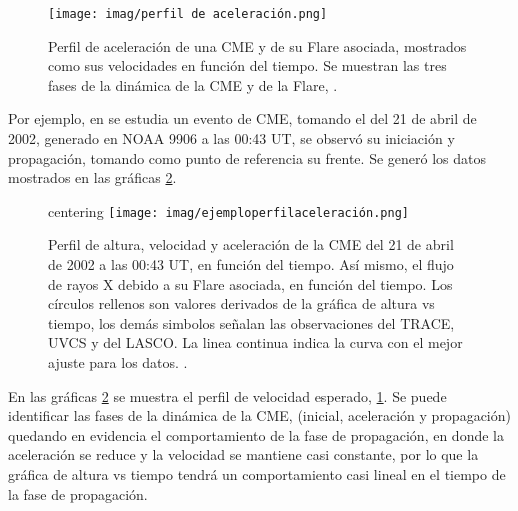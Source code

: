 \begin{figure}[H]
\centering
    \texttt{[image: imag/perfil de aceleración.png]}
    \caption[Gráfica de velocidad de propagación de la CME en función del tiempo, con sus diferentes etapas]{Perfil de aceleración de una \ac{CME} y de su Flare asociada, mostrados como sus velocidades en función del tiempo. Se muestran las tres fases de la dinámica de la \ac{CME} y de la Flare, \cite{zhang-2006}.}
    \label{fig:perfilaceleración}
\end{figure}

Por ejemplo, en \cite{gallagher-2003} se estudia un evento de CME, tomando el del 21 de abril de 2002, generado en NOAA 9906 a las 00:43 UT, se observó su iniciación y propagación, tomando como punto de referencia su frente. Se generó los datos mostrados en las gráficas \ref{fig:ejemploperfilaceleración}.

\begin{figure}[H]
centering
    \texttt{[image: imag/ejemploperfilaceleración.png]}
    \caption[Gráficas experimentales de altura, velocidad de propagación y aceleración de la CME en función del tiempo]{Perfil de altura, velocidad y aceleración de la \ac{CME} del 21 de abril de 2002 a las 00:43 UT, en función del tiempo. Así mismo, el flujo de rayos X debido a su Flare asociada, en función del tiempo. Los círculos rellenos son valores derivados de la gráfica de altura vs tiempo, los demás simbolos señalan las observaciones del TRACE, UVCS y del LASCO. La linea continua indica la curva con el mejor ajuste para los datos. \cite{gallagher-2003}.}
    \label{fig:ejemploperfilaceleración}
\end{figure}

En las gráficas \ref{fig:ejemploperfilaceleración} se muestra el perfil de velocidad esperado, \ref{fig:perfilaceleración}. Se puede identificar las fases de la dinámica de la CME, (inicial, aceleración y propagación) quedando en evidencia el comportamiento de la fase de propagación, en donde la aceleración se reduce y la velocidad se mantiene casi constante, por lo que la gráfica de altura vs tiempo tendrá un comportamiento casi lineal en el tiempo de la fase de propagación.

